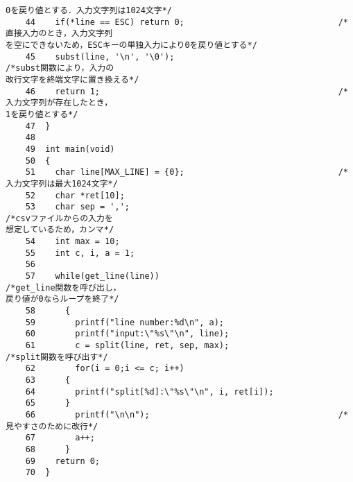 \begin{Verbatim}[fontsize=\small, baselinestretch=0.8]
0を戻り値とする．入力文字列は1024文字*/
    44	  if(*line == ESC) return 0;                               /*直接入力のとき，入力文字列
を空にできないため，ESCキーの単独入力により0を戻り値とする*/
    45	  subst(line, '\n', '\0');                                 /*subst関数により，入力の
改行文字を終端文字に置き換える*/
    46	  return 1;                                                /*入力文字列が存在したとき，
1を戻り値とする*/
    47	}
    48	
    49	int main(void)
    50	{
    51	  char line[MAX_LINE] = {0};                               /*入力文字列は最大1024文字*/
    52	  char *ret[10];
    53	  char sep = ',';                                          /*csvファイルからの入力を
想定しているため，カンマ*/
    54	  int max = 10;
    55	  int c, i, a = 1;
    56	  
    57	  while(get_line(line))                                    /*get_line関数を呼び出し，
戻り値が0ならループを終了*/
    58	    {
    59	      printf("line number:%d\n", a);
    60	      printf("input:\"%s\"\n", line);
    61	      c = split(line, ret, sep, max);                      /*split関数を呼び出す*/
    62	      for(i = 0;i <= c; i++)
    63		{
    64		  printf("split[%d]:\"%s\"\n", i, ret[i]);
    65		}
    66	      printf("\n\n");                                      /*見やすさのために改行*/
    67	      a++;
    68	    }
    69	  return 0;
    70	}
\end{Verbatim}

